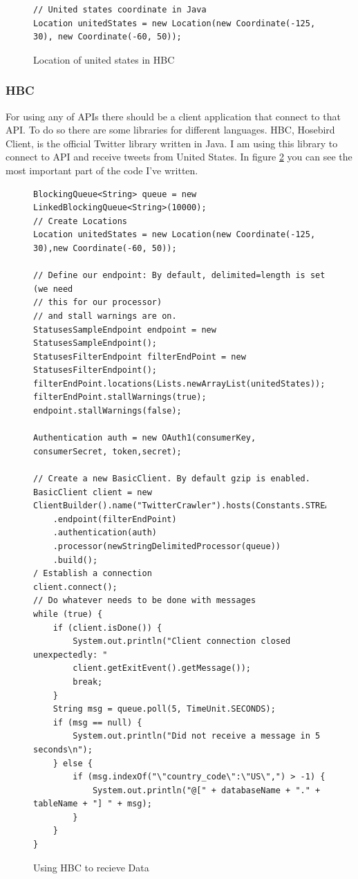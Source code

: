 \documentclass[a4paper,11pt]{report}
\begin{document}
\begin{figure}[!hbp]
\caption{Location of united states in HBC}
\begin{lstlisting}
// United states coordinate in Java
Location unitedStates = new Location(new Coordinate(-125, 30), new Coordinate(-60, 50));
\end{lstlisting}
\label{fig:hbcus}
\end{figure}

\subsubsection{HBC}
For using any of APIs there should be a client application that connect to that API. To do so there are some libraries for different languages. HBC, Hosebird Client, is the official Twitter library written in Java. I am using this library to connect to API and receive tweets from United States. In figure \ref{fig:hbccode} you can see the most important part of the code I've written.

\begin{figure}[!hbp]
\begin{lstlisting}
BlockingQueue<String> queue = new LinkedBlockingQueue<String>(10000);
// Create Locations
Location unitedStates = new Location(new Coordinate(-125, 30),new Coordinate(-60, 50));

// Define our endpoint: By default, delimited=length is set (we need
// this for our processor)
// and stall warnings are on.
StatusesSampleEndpoint endpoint = new StatusesSampleEndpoint();
StatusesFilterEndpoint filterEndPoint = new StatusesFilterEndpoint();
filterEndPoint.locations(Lists.newArrayList(unitedStates));
filterEndPoint.stallWarnings(true);
endpoint.stallWarnings(false);

Authentication auth = new OAuth1(consumerKey, consumerSecret, token,secret);

// Create a new BasicClient. By default gzip is enabled.
BasicClient client = new ClientBuilder().name("TwitterCrawler").hosts(Constants.STREAM_HOST)
	.endpoint(filterEndPoint)
	.authentication(auth)
	.processor(newStringDelimitedProcessor(queue))
	.build();
/ Establish a connection
client.connect();
// Do whatever needs to be done with messages
while (true) {
	if (client.isDone()) {
    	System.out.println("Client connection closed unexpectedly: "
    	client.getExitEvent().getMessage());
    	break;
    }
	String msg = queue.poll(5, TimeUnit.SECONDS);
	if (msg == null) {
		System.out.println("Did not receive a message in 5 seconds\n");
	} else {
		if (msg.indexOf("\"country_code\":\"US\",") > -1) {
			System.out.println("@[" + databaseName + "." + tableName + "] " + msg);
		}
	}
}
\end{lstlisting}
\caption{Using HBC to recieve Data}
\label{fig:hbccode}
\end{figure}
\end{document}
